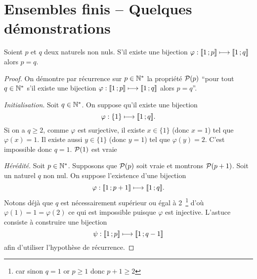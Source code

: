 \chapter{Ensembles finis -- Quelques démonstrations}
\label{chap:ensemblesFinis}
\begin{theo}
  Soient $p$ et $q$ deux naturels non nuls. S'il existe une bijection $\varphi : \intervalleentier{1}{p} \longmapsto \intervalleentier{1}{q}$ alors $p=q$.
\end{theo}
\begin{proof}
  On démontre par récurrence sur $p \in \N^*$ la propriété $\P(p)$ ``pour tout $q \in \N^*$ s'il existe une bijection $\varphi : \intervalleentier{1}{p} \longmapsto \intervalleentier{1}{q}$ alors $p=q$''.

\emph{Initialisation}. Soit $q \in \N^*$. On suppose qu'il existe une bijection
\begin{equation}
  \varphi : \{1\} \longmapsto \intervalleentier{1}{q}.
\end{equation}
Si on a $q \geq 2$, comme $\varphi$ est surjective, il existe $x \in \{1\}$ (donc $x=1$) tel que $\varphi(x)=1$. Il existe aussi $y \in \{1\}$ (donc $y=1$) tel que $\varphi(y) = 2$. C'est impossible donc $q=1$. $\P(1)$ est vraie

\emph{Hérédité}. Soit $p \in \N^*$. Supposons que $\P(p)$ soit vraie et montrons $\P(p+1)$. Soit un naturel $q$ non nul. On suppose l'existence d'une bijection
\begin{equation}
  \varphi : \intervalleentier{1}{p+1} \longmapsto \intervalleentier{1}{q}.
\end{equation}
Notons déjà que $q$ est nécessairement supérieur ou égal à 2~\footnote{car sinon $q=1$ or $p \geq 1$ donc $p+1 \geq 2$} d'où $\varphi(1)=1=\varphi(2)$ ce qui est impossible puisque $\varphi$ est injective. L'astuce consiste à construire une bijection
\begin{equation}
  \psi : \intervalleentier{1}{p} \longmapsto \intervalleentier{1}{q-1}
\end{equation}
afin d'utiliser l'hypothèse de récurrence.


\end{proof}
